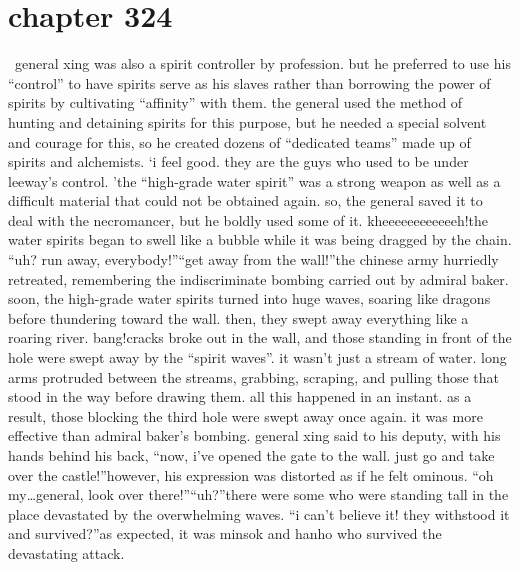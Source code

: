 \section{chapter 324}






 general xing was also a spirit controller by profession.
 but he preferred to use his “control” to have spirits serve as his slaves rather than borrowing the power of spirits by cultivating “affinity” with them.
 the general used the method of hunting and detaining spirits for this purpose, but he needed a special solvent and courage for this, so he created dozens of “dedicated teams” made up of spirits and alchemists.
‘i feel good.
 they are the guys who used to be under leeway’s control.
’the “high-grade water spirit” was a strong weapon as well as a difficult material that could not be obtained again.
 so, the general saved it to deal with the necromancer, but he boldly used some of it.
kheeeeeeeeeeeeh!the water spirits began to swell like a bubble while it was being dragged by the chain.
“uh? run away, everybody!”“get away from the wall!”the chinese army hurriedly retreated, remembering the indiscriminate bombing carried out by admiral baker.
 soon, the high-grade water spirits turned into huge waves, soaring like dragons before thundering toward the wall.
 then, they swept away everything like a roaring river.
bang!cracks broke out in the wall, and those standing in front of the hole were swept away by the “spirit waves”.
it wasn’t just a stream of water.
 long arms protruded between the streams, grabbing, scraping, and pulling those that stood in the way before drawing them.
 all this happened in an instant.
as a result, those blocking the third hole were swept away once again.
 it was more effective than admiral baker’s bombing.
general xing said to his deputy, with his hands behind his back, “now, i’ve opened the gate to the wall.
 just go and take over the castle!”however, his expression was distorted as if he felt ominous.
“oh my…general, look over there!”“uh?”there were some who were standing tall in the place devastated by the overwhelming waves.
 “i can’t believe it! they withstood it and survived?”as expected, it was minsok and hanho who survived the devastating attack.

